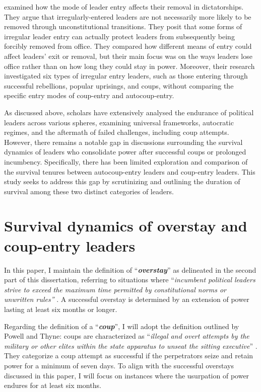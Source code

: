 \documentclass[
  12pt,
  a4paper,
  12pt]{article}
\begin{document}
\citet{sudduth2018} examined how the mode of leader entry affects their
removal in dictatorships. They argue that irregularly-entered leaders
are not necessarily more likely to be removed through unconstitutional
transitions. They posit that some forms of irregular leader entry can
actually protect leaders from subsequently being forcibly removed from
office. They compared how different means of entry could affect leaders'
exit or removal, but their main focus was on the ways leaders lose
office rather than on how long they could stay in power. Moreover, their
research investigated six types of irregular entry leaders, such as
those entering through successful rebellions, popular uprisings, and
coups, without comparing the specific entry modes of coup-entry and
autocoup-entry.

As discussed above, scholars have extensively analysed the endurance of
political leaders across various spheres, examining universal
frameworks, autocratic regimes, and the aftermath of failed challenges,
including coup attempts. However, there remains a notable gap in
discussions surrounding the survival dynamics of leaders who consolidate
power after successful coups or prolonged incumbency. Specifically,
there has been limited exploration and comparison of the survival
tenures between autocoup-entry leaders and coup-entry leaders. This
study seeks to address this gap by scrutinizing and outlining the
duration of survival among these two distinct categories of leaders.

\newpage

\section{Survival dynamics of overstay and coup-entry
leaders}\label{survival-dynamics-of-overstay-and-coup-entry-leaders}

In this paper, I maintain the definition of ``\textbf{\emph{overstay}}''
as delineated in the second part of this dissertation, referring to
situations where ``\emph{incumbent political leaders strive to exceed
the maximum time permitted by constitutional norms or unwritten rules''}
\citep[p5]{zhu2024}. A successful overstay is determined by an extension
of power lasting at least six months or longer.

Regarding the definition of a ``\textbf{\emph{coup}}'', I will adopt the
definition outlined by Powell and Thyne: coups are characterized as
``\emph{illegal and overt attempts by the military or other elites
within the state apparatus to unseat the sitting executive}''
\citep[p252]{powell2011}. They categorize a coup attempt as successful
if the perpetrators seize and retain power for a minimum of seven days.
To align with the successful overstays discussed in this paper, I will
focus on instances where the usurpation of power endures for at least
six months.
\end{document}
